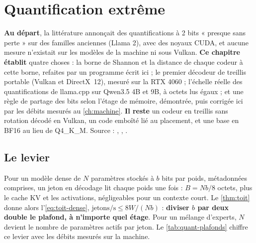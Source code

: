 \chapter{Quantification extrême}\label{ch:quant}

\begin{origine}
\textbf{Au départ}, la littérature annonçait des quantifications à 2 bits « presque sans perte » sur des familles anciennes (Llama 2), avec des noyaux CUDA, et aucune mesure n'existait sur les modèles de la machine ni sous Vulkan.
\textbf{Ce chapitre établit} quatre choses : la borne de Shannon et la distance de chaque codeur à cette borne, refaites par un programme écrit ici ; le premier décodeur de treillis portable (Vulkan et DirectX~12), mesuré sur la RTX 4060 ; l'échelle réelle des quantifications de llama.cpp sur Qwen3.5 4B et 9B, à octets lus égaux ; et une règle de partage des bits selon l'étage de mémoire, démontrée, puis corrigée ici par les débits mesurés au \cref{ch:machine}.
\textbf{Il reste} un codeur en treillis sans rotation décodé en Vulkan, un code emboîté lié au placement, et une base en BF16 au lieu de Q4\_K\_M.
Source : , , .
\end{origine}

\section{Le levier}\label{sec:quant-levier}

Pour un modèle dense de $N$ paramètres stockés à $b$ bits par poids, métadonnées comprises, un jeton en décodage lit chaque poids une fois : $B = N b / 8$ octets, plus le cache KV et les activations, négligeables pour un contexte court. Le \cref{thm:toit} donne alors l'\cref{eq:toit-dense}, $\text{jetons/s} \le 8W/(Nb)$ : \textbf{diviser $b$ par deux double le plafond, à n'importe quel étage}. Pour un mélange d'experts, $N$ devient le nombre de paramètres actifs par jeton. Le \cref{tab:quant-plafonds} chiffre ce levier avec les débits mesurés sur la machine.

